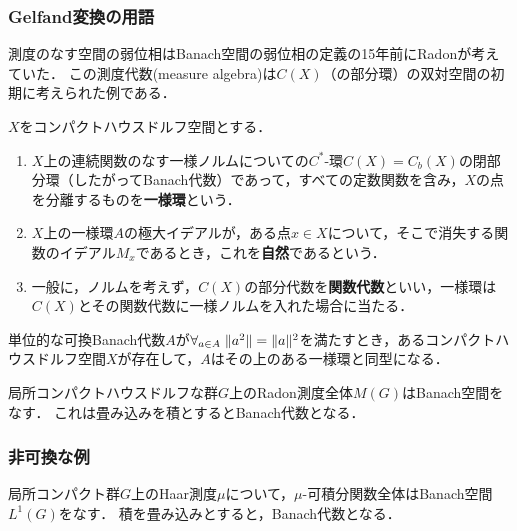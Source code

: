 \documentclass[uplatex,dvipdfmx]{jsreport}
\begin{document}
\subsubsection{Gelfand変換の用語}

\begin{tcolorbox}[colframe=ForestGreen, colback=ForestGreen!10!white,breakable,colbacktitle=ForestGreen!40!white,coltitle=black,fonttitle=\bfseries\sffamily,
title=]
    測度のなす空間の弱位相はBanach空間の弱位相の定義の15年前にRadonが考えていた．
    この測度代数(measure algebra)は$C(X)$（の部分環）の双対空間の初期に考えられた例である．
\end{tcolorbox}

\begin{definition}\label{def-uniform-algebra}
    $X$をコンパクトハウスドルフ空間とする．
    \begin{enumerate}
        \item $X$上の連続関数のなす一様ノルムについての$C^*$-環$C(X)=C_b(X)$の閉部分環（したがってBanach代数）であって，すべての定数関数を含み，$X$の点を分離するものを\textbf{一様環}という．
        \item $X$上の一様環$A$の極大イデアルが，ある点$x\in X$について，そこで消失する関数のイデアル$M_x$であるとき，これを\textbf{自然}であるという．
        \item 一般に，ノルムを考えず，$C(X)$の部分代数を\textbf{関数代数}といい，一様環は$C(X)$とその関数代数に一様ノルムを入れた場合に当たる．
    \end{enumerate}
\end{definition}

\begin{corollary}
    単位的な可換Banach代数$A$が$\forall_{a\in A}\;\|a^2\|=\|a\|^2$を満たすとき，あるコンパクトハウスドルフ空間$X$が存在して，$A$はその上のある一様環と同型になる．
\end{corollary}

\begin{example}
    局所コンパクトハウスドルフな群$G$上のRadon測度全体$M(G)$はBanach空間をなす．
    これは畳み込みを積とするとBanach代数となる．
\end{example}

\subsubsection{非可換な例}

\begin{example}[群環：可測関数の代数で積を合成ではなく畳み込みとしたもの]
    局所コンパクト群$G$上のHaar測度$\mu$について，$\mu$-可積分関数全体はBanach空間$L^1(G)$をなす．
    積を畳み込みとすると，Banach代数となる．
\end{example}
\end{document}
